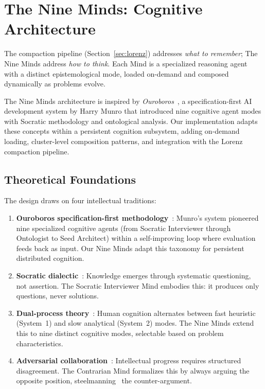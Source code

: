 \documentclass[journal,10pt]{IEEEtran}
\begin{document}
\section{The Nine Minds: Cognitive Architecture}
\label{sec:minds}

The compaction pipeline (Section~\ref{sec:lorenz}) addresses \emph{what to remember}; The Nine Minds address \emph{how to think}. Each Mind is a specialized reasoning agent with a distinct epistemological mode, loaded on-demand and composed dynamically as problems evolve.

The Nine Minds architecture is inspired by \emph{Ouroboros}~\cite{munro_ouroboros}, a specification-first AI development system by Harry Munro that introduced nine cognitive agent modes with Socratic methodology and ontological analysis. Our implementation adapts these concepts within a persistent cognition subsystem, adding on-demand loading, cluster-level composition patterns, and integration with the Lorenz compaction pipeline.

\subsection{Theoretical Foundations}

The design draws on four intellectual traditions:

\begin{enumerate}[nosep]
\item \textbf{Ouroboros specification-first methodology}~\cite{munro_ouroboros}: Munro's system pioneered nine specialized cognitive agents (from Socratic Interviewer through Ontologist to Seed Architect) within a self-improving loop where evaluation feeds back as input. Our Nine Minds adapt this taxonomy for persistent distributed cognition.

\item \textbf{Socratic dialectic}~\cite{plato_meno}: Knowledge emerges through systematic questioning, not assertion. The Socratic Interviewer Mind embodies this: it produces only questions, never solutions.

\item \textbf{Dual-process theory}~\cite{kahneman2011}: Human cognition alternates between fast heuristic (System~1) and slow analytical (System~2) modes. The Nine Minds extend this to nine distinct cognitive modes, selectable based on problem characteristics.

\item \textbf{Adversarial collaboration}~\cite{mellers2001}: Intellectual progress requires structured disagreement. The Contrarian Mind formalizes this by always arguing the opposite position, steelmanning~\cite{aikin2017} the counter-argument.
\end{enumerate}
\end{document}

